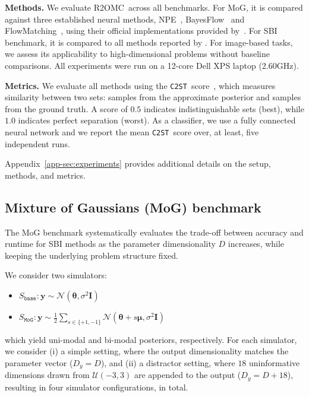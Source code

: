 \documentclass[twoside]{article}
\newcommand{\thb}{\boldsymbol{\theta}}
\newcommand{\yb}{\mathbf{y}}
\newcommand{\rromc}{R2OMC}
\newcommand{\NPE}{NPE}
\newcommand{\CtwoST}{\texttt{C2ST}}
\begin{document}
\textbf{Methods.} 
We evaluate \rromc~across all benchmarks.
For MoG, it is compared against three established neural methods, \NPE~\citep{greenberg2019automatic}, BayesFlow~\citep{radev2020bayesflow} and FlowMatching~\citep{wildberger2023flow}, using their official implementations provided by~\citet{tejero-cantero2020sbi}.
For SBI benchmark, it is compared to all methods reported by \citet{lueckmann2021benchmarking}.
For image-based tasks, we assess its applicability to high-dimensional problems without baseline comparisons. 
All experiments were run on a 12-core Dell XPS laptop (2.60GHz). 

\textbf{Metrics.}
We evaluate all methods using the \CtwoST~score~\citep{gutmann2018likelihood, lueckmann2021benchmarking}, which measures similarity between two sets: samples from the approximate posterior and samples from the ground truth. 
A score of $0.5$ indicates indistinguishable sets (best), while $1.0$ indicates perfect separation (worst). 
As a classifier, we use a fully connected neural network and we report the mean \CtwoST~score over, at least, five independent runs.

Appendix~\ref{app-sec:experiments} provides additional details on the setup, methods, and metrics.

\subsection{Mixture of Gaussians (MoG) benchmark}
\label{subsec:gaussian}

The MoG benchmark systematically evaluates the trade-off between accuracy and runtime for SBI methods as the parameter dimensionality $D$ increases, while keeping the underlying problem structure fixed.

We consider two simulators:
\begin{itemize}
    \item $S_{\mathtt{base}}: \yb \sim \mathcal{N}(\thb, \sigma^2 \mathbf{I})$
    \item $S_{\mathtt{MoG}}: \yb \sim \frac{1}{2} \sum_{s \in \{+1, -1\}} \mathcal{N}(\thb + s\boldsymbol{\mu}, \sigma^2 \mathbf{I})$
\end{itemize}
which yield uni-modal and bi-modal posteriors, respectively.
For each simulator, we consider (i) a simple setting, where the output dimensionality matches the parameter vector ($D_y = D$), and (ii) a distractor setting, where $18$ uninformative dimensions drawn from $\mathcal{U}(-3, 3)$ are appended to the output ($D_y = D + 18$), resulting in four simulator configurations, in total.
\end{document}
